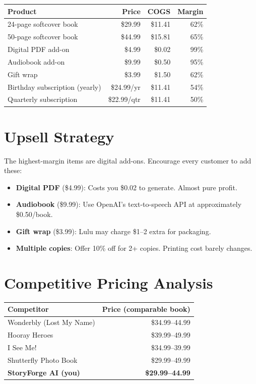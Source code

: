 \documentclass[12pt, letterpaper, oneside]{book}
\begin{document}
\begin{table}[H]
\centering
\begin{tabularx}{\textwidth}{Xrrr}
\toprule
\textbf{Product} & \textbf{Price} & \textbf{COGS} & \textbf{Margin} \\
\midrule
24-page softcover book & \$29.99 & \$11.41 & 62\% \\
50-page softcover book & \$44.99 & \$15.81 & 65\% \\
Digital PDF add-on & \$4.99 & \$0.02 & 99\% \\
Audiobook add-on & \$9.99 & \$0.50 & 95\% \\
Gift wrap & \$3.99 & \$1.50 & 62\% \\
Birthday subscription (yearly) & \$24.99/yr & \$11.41 & 54\% \\
Quarterly subscription & \$22.99/qtr & \$11.41 & 50\% \\
\bottomrule
\end{tabularx}
\end{table}

\section{Upsell Strategy}

The highest-margin items are digital add-ons. Encourage every customer to add these:

\begin{itemize}[leftmargin=2em]
  \item \textbf{Digital PDF} (\$4.99): Costs you \$0.02 to generate. Almost pure profit.
  \item \textbf{Audiobook} (\$9.99): Use OpenAI's text-to-speech API at approximately \$0.50/book.
  \item \textbf{Gift wrap} (\$3.99): Lulu may charge \$1--2 extra for packaging.
  \item \textbf{Multiple copies}: Offer 10\% off for 2+ copies. Printing cost barely changes.
\end{itemize}

\section{Competitive Pricing Analysis}

\begin{table}[H]
\centering
\begin{tabularx}{\textwidth}{Xr}
\toprule
\textbf{Competitor} & \textbf{Price (comparable book)} \\
\midrule
Wonderbly (Lost My Name) & \$34.99--44.99 \\
Hooray Heroes & \$39.99--49.99 \\
I See Me! & \$34.99--39.99 \\
Shutterfly Photo Book & \$29.99--49.99 \\
\textbf{StoryForge AI (you)} & \textbf{\$29.99--44.99} \\
\bottomrule
\end{tabularx}
\end{table}
\end{document}
